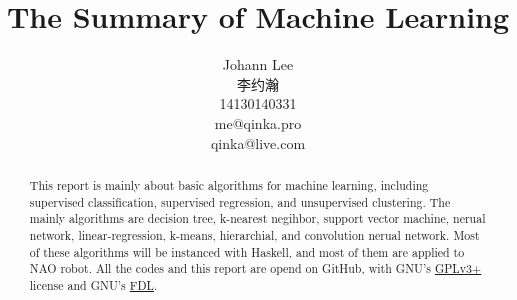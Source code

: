 \documentclass[twoside]{article}
\title{The Summary of Machine Learning}
\author{Johann Lee \\ 李约瀚 \\ 14130140331 \\  me@qinka.pro \\ qinka@live.com}
\begin{document}
    
    
    
\maketitle
\begin{abstract}
  This report is mainly about basic algorithms for machine learning,
  including supervised classification, supervised regression, and unsupervised clustering.
  The mainly algorithms are decision tree, k-nearest negihbor, support vector machine, nerual network,
  linear-regression, k-means, hierarchial, and convolution nerual network.
  Most of these algorithms will be instanced with Haskell, and most of them are applied to NAO robot.
  All the codes and this report are opend on GitHub, with GNU's
  \href{https://www.gnu.org/copyleft/gpl.html}{GPLv3+} license and GNU's
  \href{https://www.gnu.org/licenses/quick-guide-gplv3.html}{FDL}.
\end{abstract}
\end{document}
